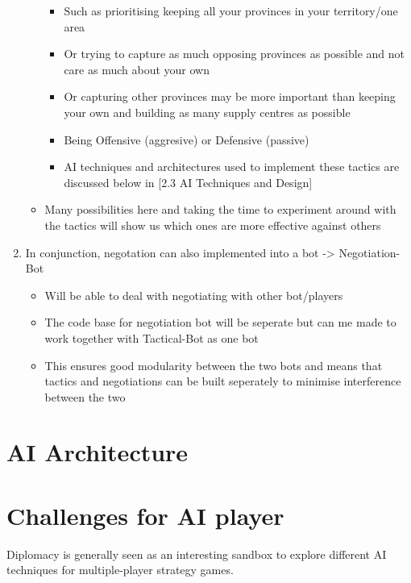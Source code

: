 \documentclass[12pt]{article}
\begin{document}
\begin{enumerate}
\begin{itemize}
\begin{itemize}
\item Such as prioritising keeping all your provinces in your territory/one
area
\item Or trying to capture as much opposing provinces as possible and not
care as much about your own
\item Or capturing other provinces may be more important than keeping your
own and building as many supply centres as possible
\item Being Offensive (aggresive) or Defensive (passive)
\item AI techniques and architectures used to implement these tactics are discussed
below in {[}2.3 AI Techniques and Design{]}
\end{itemize}
\item Many possibilities here and taking the time to experiment around with
the tactics will show us which ones are more effective against others
\end{itemize}
\item In conjunction, negotation can also implemented into a bot -> Negotiation-Bot

\begin{itemize}
\item Will be able to deal with negotiating with other bot/players
\item The code base for negotiation bot will be seperate but can me made
to work together with Tactical-Bot as one bot
\item This ensures good modularity between the two bots and means that tactics
and negotiations can be built seperately to minimise interference
between the two
\end{itemize}
\end{enumerate}


\section{AI Architecture}

\section{Challenges for AI player}

Diplomacy is generally seen as an interesting sandbox to explore
different AI techniques for multiple-player strategy games.
\end{document}
